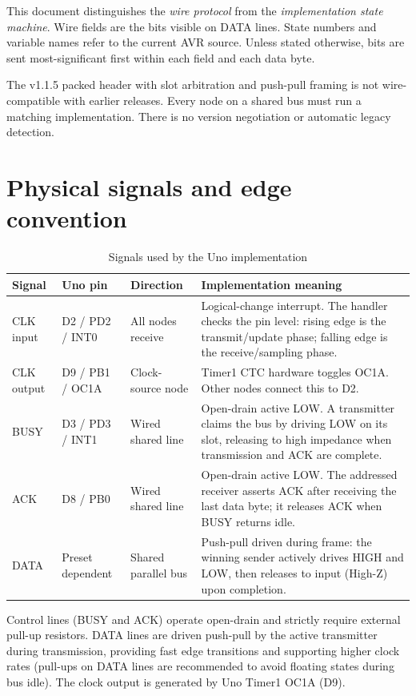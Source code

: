 \documentclass[a4paper,9pt]{extarticle}
\begin{document}
This document distinguishes the \emph{wire protocol} from the \emph{implementation state machine}. Wire fields are the bits visible on DATA lines. State numbers and variable names refer to the current AVR source. Unless stated otherwise, bits are sent most-significant first within each field and each data byte.

\begin{tcolorbox}[colback=lightblue,colframe=blue,title=Important compatibility note]
The v1.1.5 packed header with slot arbitration and push-pull framing is not wire-compatible with earlier releases. Every node on a shared bus must run a matching implementation. There is no version negotiation or automatic legacy detection.
\end{tcolorbox}

\section{Physical signals and edge convention}
\begin{table}[h]
\centering\small
\caption{Signals used by the Uno implementation}
\begin{tabularx}{\linewidth}{@{}l l l Y@{}}\toprule
Signal & Uno pin & Direction & Implementation meaning \\\midrule
CLK input & D2 / PD2 / INT0 & All nodes receive & Logical-change interrupt. The handler checks the pin level: rising edge is the transmit/update phase; falling edge is the receive/sampling phase. \\
CLK output & D9 / PB1 / OC1A & Clock-source node & Timer1 CTC hardware toggles OC1A. Other nodes connect this to D2. \\
BUSY & D3 / PD3 / INT1 & Wired shared line & Open-drain active LOW. A transmitter claims the bus by driving LOW on its slot, releasing to high impedance when transmission and ACK are complete. \\
ACK & D8 / PB0 & Wired shared line & Open-drain active LOW. The addressed receiver asserts ACK after receiving the last data byte; it releases ACK when BUSY returns idle. \\
DATA & Preset dependent & Shared parallel bus & Push-pull driven during frame: the winning sender actively drives HIGH and LOW, then releases to input (High-Z) upon completion. \\\bottomrule
\end{tabularx}
\end{table}

Control lines (BUSY and ACK) operate open-drain and strictly require external pull-up resistors. DATA lines are driven push-pull by the active transmitter during transmission, providing fast edge transitions and supporting higher clock rates (pull-ups on DATA lines are recommended to avoid floating states during bus idle). The clock output is generated by Uno Timer1 OC1A (D9).
\end{document}
